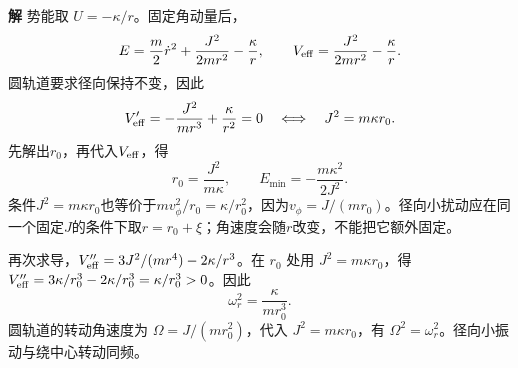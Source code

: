 \documentclass[11pt,openany,fontset=fandol]{ctexbook}
\theoremstyle{definition}\newtheorem{example}{例}[chapter]\newtheorem{exercise}{习题}[chapter]
\newcommand{\SolutionStart}{\par\medskip\ifdim\pagetotal>0pt\ifdim\dimexpr\pagegoal-\pagetotal\relax<3\baselineskip\newpage\fi\fi\noindent\textbf{解}\quad\ignorespaces}
\newenvironment{solution}{\SolutionStart}{\par\medskip}
\begin{document}
\begin{solution}
势能取 $U=-\kappa/r$。固定角动量后，
\[
E=\frac m2\dot r^2+\frac{J^2}{2mr^2}-\frac\kappa r,
\qquad V_{\rm eff}=\frac{J^2}{2mr^2}-\frac\kappa r.
\]
圆轨道要求径向保持不变，因此
\[
V_{\rm eff}'=-\frac{J^2}{mr^3}+\frac\kappa{r^2}=0
\quad\Longleftrightarrow\quad J^2=m\kappa r_0.
\]
先解出$r_0$，再代入$V_{\rm eff}$，得
\[
\boxed{r_0=\frac{J^2}{m\kappa},\qquad
E_{\min}=-\frac{m\kappa^2}{2J^2}.}
\]
条件$J^2=m\kappa r_0$也等价于$mv_\phi^2/r_0=\kappa/r_0^2$，因为$v_\phi=J/(mr_0)$。径向小扰动应在同一个固定$J$的条件下取$r=r_0+\xi$；角速度会随$r$改变，不能把它额外固定。

再次求导，$V_{\rm eff}''=3J^2/(mr^4)-2\kappa/r^3$。在 $r_0$ 处用 $J^2=m\kappa r_0$，得 $V_{\rm eff}''=3\kappa/r_0^3-2\kappa/r_0^3=\kappa/r_0^3>0$。因此
\[
\omega_r^2=\frac\kappa{mr_0^3}.
\]
圆轨道的转动角速度为 $\Omega=J/(mr_0^2)$，代入 $J^2=m\kappa r_0$，有 $\Omega^2=\omega_r^2$。径向小振动与绕中心转动同频。


\end{solution}
\end{document}
